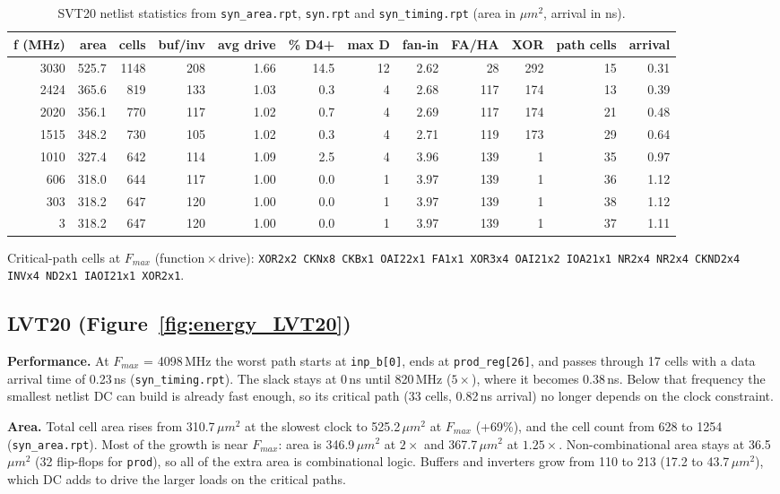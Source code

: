 \documentclass[11pt]{article}
\begin{document}
\begin{table}[H]
\begin{center}
\small
\begin{tabular}{r|r|r|r|r|r|r|r|r|r|r|r}
\hline
f (MHz) & area & cells & buf/inv & avg drive & \% D4+ & max D & fan-in & FA/HA & XOR & path cells & arrival \\
\hline
3030 & 525.7 & 1148 & 208 & 1.66 & 14.5 & 12 & 2.62 & 28 & 292 & 15 & 0.31 \\
2424 & 365.6 & 819 & 133 & 1.03 & 0.3 & 4 & 2.68 & 117 & 174 & 13 & 0.39 \\
2020 & 356.1 & 770 & 117 & 1.02 & 0.7 & 4 & 2.69 & 117 & 174 & 21 & 0.48 \\
1515 & 348.2 & 730 & 105 & 1.02 & 0.3 & 4 & 2.71 & 119 & 173 & 29 & 0.64 \\
1010 & 327.4 & 642 & 114 & 1.09 & 2.5 & 4 & 3.96 & 139 & 1 & 35 & 0.97 \\
606 & 318.0 & 644 & 117 & 1.00 & 0.0 & 1 & 3.97 & 139 & 1 & 36 & 1.12 \\
303 & 318.2 & 647 & 120 & 1.00 & 0.0 & 1 & 3.97 & 139 & 1 & 38 & 1.12 \\
3 & 318.2 & 647 & 120 & 1.00 & 0.0 & 1 & 3.97 & 139 & 1 & 37 & 1.11 \\
\hline
\end{tabular}
\end{center}
\caption{SVT20 netlist statistics from \texttt{syn\_area.rpt}, \texttt{syn.rpt} and \texttt{syn\_timing.rpt} (area in $\mu m^2$, arrival in ns).}
\end{table}
Critical-path cells at $F_{max}$ (function\,$\times$\,drive): \texttt{XOR2x2 CKNx8 CKBx1 OAI22x1 FA1x1 XOR3x4 OAI21x2 IOA21x1 NR2x4 NR2x4 CKND2x4 INVx4 ND2x1 IAOI21x1 XOR2x1}.

\subsection*{LVT20 (Figure~\ref{fig:energy_LVT20})}

\textbf{Performance.} At $F_{max}$ = 4098\,MHz the worst path starts at \texttt{inp\_b[0]}, ends at \texttt{prod\_reg[26]}, and passes through 17 cells with a data arrival time of 0.23\,ns (\texttt{syn\_timing.rpt}). The slack stays at 0\,ns until 820\,MHz ($5\times$), where it becomes 0.38\,ns. Below that frequency the smallest netlist DC can build is already fast enough, so its critical path (33 cells, 0.82\,ns arrival) no longer depends on the clock constraint.

\textbf{Area.} Total cell area rises from 310.7\,$\mu m^2$ at the slowest clock to 525.2\,$\mu m^2$ at $F_{max}$ (+69\%), and the cell count from 628 to 1254 (\texttt{syn\_area.rpt}). Most of the growth is near $F_{max}$: area is 346.9\,$\mu m^2$ at $2\times$ and 367.7\,$\mu m^2$ at $1.25\times$. Non-combinational area stays at 36.5\,$\mu m^2$ (32 flip-flops for \texttt{prod}), so all of the extra area is combinational logic. Buffers and inverters grow from 110 to 213 (17.2 to 43.7\,$\mu m^2$), which DC adds to drive the larger loads on the critical paths.
\end{document}
